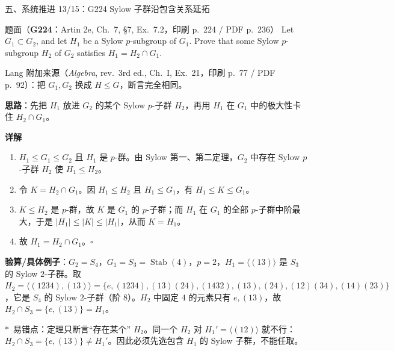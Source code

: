 \documentclass[aspectratio=169,10pt,fontset=none]{ctexbeamer}
\newcommand{\ex}[1]{\textcolor{accent}{\footnotesize\bfseries #1}}
\newcommand{\key}[1]{\textcolor{ink}{\bfseries #1}}
\newcommand{\starpt}{\textcolor{accent}{\bfseries$\ast$}}
\begin{document}
\begin{frame}[t]{五、系统推进 13/15：G224 Sylow 子群沿包含关系延拓}
\label{ex:G224}\leavevmode
\scriptsize
\begin{block}{\footnotesize 题面（\ex{G224}：Artin 2e, Ch.~7, \S7, Ex.~7.2，印刷 p.~224 / PDF p.~236）}
Let $G_1\subset G_2$, and let $H_1$ be a Sylow $p$-subgroup of $G_1$. Prove that some Sylow $p$-subgroup $H_2$ of $G_2$ satisfies $H_1=H_2\cap G_1$.

Lang 附加来源（\textit{Algebra}, rev.\ 3rd ed., Ch.~I, Ex.~21，印刷 p.~77 / PDF p.~92）：把 $G_1,G_2$ 换成 $H\le G$，断言完全相同。
\end{block}
\key{思路}：先把 $H_1$ 放进 $G_2$ 的某个 Sylow $p$-子群 $H_2$，再用 $H_1$ 在 $G_1$ 中的极大性卡住 $H_2\cap G_1$。

\key{详解}
\begin{enumerate}
  \item $H_1\le G_1\le G_2$ 且 $H_1$ 是 $p$-群。由 Sylow 第一、第二定理，$G_2$ 中存在 Sylow $p$-子群 $H_2$ 使 $H_1\le H_2$。
  \item 令 $K=H_2\cap G_1$。因 $H_1\le H_2$ 且 $H_1\le G_1$，有 $H_1\le K\le G_1$。
  \item $K\le H_2$ 是 $p$-群，故 $K$ 是 $G_1$ 的 $p$-子群；而 $H_1$ 在 $G_1$ 的全部 $p$-子群中阶最大，于是 $|H_1|\le|K|\le|H_1|$，从而 $K=H_1$。
  \item 故 $H_1=H_2\cap G_1$。$\square$
\end{enumerate}
\key{验算/具体例子}：$G_2=S_4$，$G_1=S_3=\operatorname{Stab}(4)$，$p=2$，$H_1=\langle(13)\rangle$ 是 $S_3$ 的 Sylow $2$-子群。取 $H_2=\langle(1234),(13)\rangle=\{e,(1234),(13)(24),(1432),(13),(24),(12)(34),(14)(23)\}$，它是 $S_4$ 的 Sylow $2$-子群（阶 $8$）。$H_2$ 中固定 $4$ 的元素只有 $e,(13)$，故 $H_2\cap S_3=\{e,(13)\}=H_1$。

\starpt~易错点：定理只断言“存在某个” $H_2$。同一个 $H_2$ 对 $H_1'=\langle(12)\rangle$ 就不行：$H_2\cap S_3=\{e,(13)\}\ne H_1'$。因此必须先选包含 $H_1$ 的 Sylow 子群，不能任取。
\end{frame}
\end{document}
